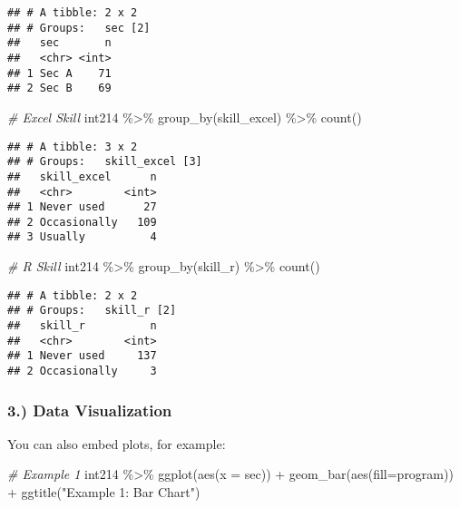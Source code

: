 \documentclass[
]{article}
\newenvironment{Shaded}{\begin{snugshade}}{\end{snugshade}}
\newcommand{\AttributeTok}[1]{\textcolor[rgb]{0.77,0.63,0.00}{#1}}
\newcommand{\CommentTok}[1]{\textcolor[rgb]{0.56,0.35,0.01}{\textit{#1}}}
\newcommand{\FunctionTok}[1]{\textcolor[rgb]{0.00,0.00,0.00}{#1}}
\newcommand{\NormalTok}[1]{#1}
\newcommand{\SpecialCharTok}[1]{\textcolor[rgb]{0.00,0.00,0.00}{#1}}
\newcommand{\StringTok}[1]{\textcolor[rgb]{0.31,0.60,0.02}{#1}}
\begin{document}
\begin{verbatim}
## # A tibble: 2 x 2
## # Groups:   sec [2]
##   sec       n
##   <chr> <int>
## 1 Sec A    71
## 2 Sec B    69
\end{verbatim}

\begin{Shaded}
\begin{Highlighting}[]
\CommentTok{\# Excel Skill}
\NormalTok{int214 }\SpecialCharTok{\%\textgreater{}\%} \FunctionTok{group\_by}\NormalTok{(skill\_excel) }\SpecialCharTok{\%\textgreater{}\%} \FunctionTok{count}\NormalTok{()}
\end{Highlighting}
\end{Shaded}

\begin{verbatim}
## # A tibble: 3 x 2
## # Groups:   skill_excel [3]
##   skill_excel      n
##   <chr>        <int>
## 1 Never used      27
## 2 Occasionally   109
## 3 Usually          4
\end{verbatim}

\begin{Shaded}
\begin{Highlighting}[]
\CommentTok{\# R Skill}
\NormalTok{int214 }\SpecialCharTok{\%\textgreater{}\%} \FunctionTok{group\_by}\NormalTok{(skill\_r) }\SpecialCharTok{\%\textgreater{}\%} \FunctionTok{count}\NormalTok{()}
\end{Highlighting}
\end{Shaded}

\begin{verbatim}
## # A tibble: 2 x 2
## # Groups:   skill_r [2]
##   skill_r          n
##   <chr>        <int>
## 1 Never used     137
## 2 Occasionally     3
\end{verbatim}

\hypertarget{data-visualization}{%
\subsubsection{3.) Data Visualization}\label{data-visualization}}

You can also embed plots, for example:

\begin{Shaded}
\begin{Highlighting}[]
\CommentTok{\# Example 1}
\NormalTok{int214 }\SpecialCharTok{\%\textgreater{}\%} \FunctionTok{ggplot}\NormalTok{(}\FunctionTok{aes}\NormalTok{(}\AttributeTok{x =}\NormalTok{ sec)) }\SpecialCharTok{+} \FunctionTok{geom\_bar}\NormalTok{(}\FunctionTok{aes}\NormalTok{(}\AttributeTok{fill=}\NormalTok{program)) }\SpecialCharTok{+} \FunctionTok{ggtitle}\NormalTok{(}\StringTok{"Example 1: Bar Chart"}\NormalTok{)}
\end{Highlighting}
\end{Shaded}
\end{document}
